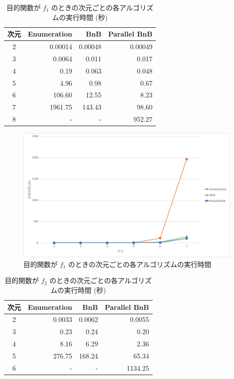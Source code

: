 \documentclass[a4paper,11pt]{jreport}
\begin{document}
\begin{table}[h]
\caption{目的関数が $ f_1 $ のときの次元ごとの各アルゴリズムの実行時間 (秒)}
\label{tbl:f_1_table}
\begin{center}
\begin{tabular}{|c|r|r|r|} \hline
次元 & Enumeration & BnB & Parallel BnB \\ \hline
2 & 0.00014 & 0.00048 & 0.00049 \\
3 & 0.0064 & 0.011 & 0.017 \\
4 & 0.19 & 0.063 & 0.048 \\
5 & 4.96 & 0.98 & 0.67 \\ 
6 & 106.60 & 12.55 & 8.23 \\
7 & 1961.75 & 143.43 & 98.60 \\
8 & - & - & 952.27 \\ \hline
\end{tabular}
\end{center}
\end{table}

\begin{figure}[h]
\begin{center}
\includegraphics[width=15cm]{graphs/f_1_time.pdf}
\caption{目的関数が $ f_1 $ のときの次元ごとの各アルゴリズムの実行時間}
\label{fig:f_1_time}
\end{center}
\end{figure}

\newpage

\begin{table}[h]
\caption{目的関数が $ f_2 $ のときの次元ごとの各アルゴリズムの実行時間 (秒)}
\label{tbl:f_2_table}
\begin{center}
\begin{tabular}{|c|r|r|r|} \hline
次元 & Enumeration & BnB & Parallel BnB \\ \hline
2 & 0.0033 & 0.0062 & 0.0055 \\
3 & 0.23 & 0.24 & 0.20 \\
4 & 8.16 & 6.29 & 2.36 \\
5 & 276.75 & 168.24 & 65.34 \\ 
6 & - & - & 1134.25 \\ \hline
\end{tabular}
\end{center}
\end{table}
\end{document}
